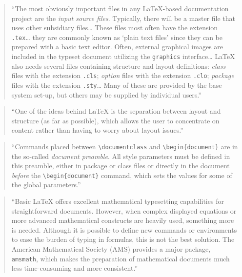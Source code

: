 \documentclass[]{tufte-book}
\begin{document}
\begin{quote}
``The most obviously important files in any LaTeX-based documentation project
are the \emph{input source files}. Typically, there will be a master file that uses
other subsidiary files\ldots{} These files most often have the extension \texttt{.tex}\ldots{}
they are commonly known as `plain text files' since they can be prepared with a basic text editor. Often, external graphical images are included in the typeset document utilizing the \texttt{graphics} interface\ldots{} LaTeX also needs several files
containing structure and layout definitions: \emph{class} files with the extension
\texttt{.cls}; \emph{option} files with the extension \texttt{.clo}; \emph{package} files with the
extension \texttt{.sty}\ldots{} Many of these are provided by the base system set-up, but
others may be supplied by individual users.'' \citep{mittelbach2004latex}
\end{quote}

\begin{quote}
``One of the ideas behind LaTeX is the separation between layout and structure
(as far as possible), which allows the user to concentrate on content rather
than having to worry about layout issues.'' \citep{mittelbach2004latex}
\end{quote}

\begin{quote}
``Commands placed between \texttt{\textbackslash{}documentclass} and \texttt{\textbackslash{}begin\{document\}} are in
the so-called \emph{document preamble}. All style parameters must be defined in this
preamble, either in package or class files or directly in the document \emph{before}
the \texttt{\textbackslash{}begin\{document\}} command, which sets the values for some of the global
parameters.'' \citep{mittelbach2004latex}
\end{quote}

\begin{quote}
``Basic LaTeX offers excellent mathematical typesetting capabilities
for straightforward documents. However, when complex displayed equations or
more advanced mathematical constructs are heavily used, something more is
needed. Although it is possible to define new commands or environments to
ease the burden of typing in formulas, this is not the best solution.
The American Mathematical Society (AMS) provides a major package, \texttt{amsmath},
which makes the preparation of mathematical documents much less time-consuming
and more consistent.'' \citep{mittelbach2004latex}
\end{quote}
\end{document}
